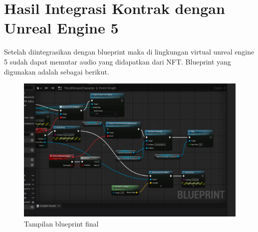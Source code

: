 \section{Hasil Integrasi Kontrak dengan Unreal Engine 5}

Setelah diintegrasikan dengan blueprint maka di lingkungan virtual unreal engine 5 sudah dapat memutar audio yang didapatkan dari NFT.
Blueprint yang digunakan adalah sebagai berikut.

\begin{figure}[H]
  \centering

  \includegraphics[scale=0.3]{gambar/blueprintfinal.jpg}

  \caption{Tampilan blueprint final}
  \label{fig:blueprintfinal}
\end{figure}
